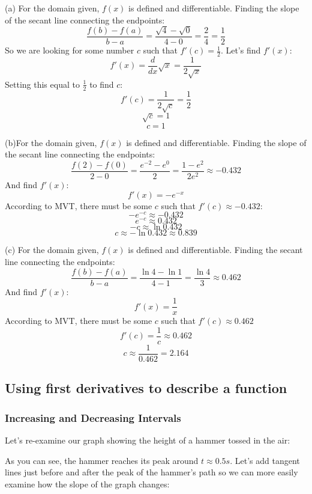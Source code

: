 \begin{Answer}
[ref=MVT2]
(a) For the domain given, $f(x)$ is defined and differentiable. Finding the slope of the secant line connecting the endpoints:
$$\frac{f(b)-f(a)}{b-a}=\frac{\sqrt{4}-\sqrt{0}}{4-0}=\frac{2}{4}=\frac{1}{2}$$
So we are looking for some number $c$ such that $f'(c) = \frac{1}{2}$. Let's find $f'(x)$:
$$f'(x) = \frac{d}{dx}\sqrt{x}=\frac{1}{2\sqrt{x}}$$
Setting this equal to $\frac{1}{2}$ to find $c$:
$$f'(c) = \frac{1}{2\sqrt{c}}=\frac{1}{2}$$
$$\sqrt{c}=1$$
$$c=1$$

(b)For the domain given, $f(x)$ is defined and differentiable. Finding the slope of the secant line connecting the endpoints:
$$\frac{f(2)-f(0)}{2-0}=\frac{e^{-2}-e^{0}}{2}=\frac{1-e^{2}}{2e^{2}}\approx -0.432$$
And find $f'(x)$:
$$f'(x) = -e^{-x}$$
According to MVT, there must be some $c$ such that $f'(c) \approx-0.432$:
$$-e^{-c} \approx -0.432$$
$$e^{-c}\approx 0.432$$
$$-c \approx \ln{0.432}$$
$$c \approx -\ln{0.432} \approx 0.839$$

(c) For the domain given, $f(x)$ is defined and differentiable. Finding the secant line connecting the endpoints:
$$\frac{f(b)-f(a)}{b-a}=\frac{\ln{4}-\ln{1}}{4-1}=\frac{\ln{4}}{3}\approx 0.462$$
And find $f'(x)$:
$$f'(x) = \frac{1}{x}$$
According to MVT, there must be some $c$ such that $f'(c) \approx 0.462$
$$f'(c) = \frac{1}{c} \approx 0.462$$
$$c \approx \frac{1}{0.462} = 2.164$$
\end{Answer}

\subsection{Using first derivatives to describe a function}
\subsubsection{Increasing and Decreasing Intervals}

Let's re-examine our graph showing the height of a hammer tossed in the air:



As you can see, the hammer reaches its peak around $t \approx 0.5s$. Let's add tangent lines just before and after the peak of the hammer's path so we can more easily examine how the slope of the graph changes:

